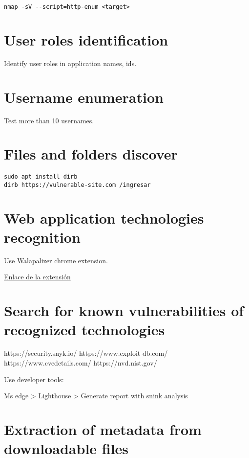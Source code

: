 \begin{lstlisting}[numbers=none]
nmap -sV --script=http-enum <target>
\end{lstlisting}

\section{User roles identification}

Identify user roles in application names, ids.

\section{Username enumeration}

Test more than 10 usernames.

\section{Files and folders discover}

\begin{lstlisting}[numbers=none]
sudo apt install dirb
dirb https://vulnerable-site.com /ingresar
\end{lstlisting}

\section{Web application technologies recognition}

Use Walapalizer chrome extension.

\href{https://chrome.google.com/webstore/detail/wappalyzer-technology-pro/gppongmhjkpfnbhagpmjfkannfbllamg}{Enlace de la extensión}

\section{Search for known vulnerabilities of recognized technologies}

https://security.snyk.io/
https://www.exploit-db.com/
https://www.cvedetails.com/
https://nvd.nist.gov/

Use developer tools:

Ms edge > Lighthouse > Generate report with snink analysis

\section{Extraction of metadata from downloadable files}

